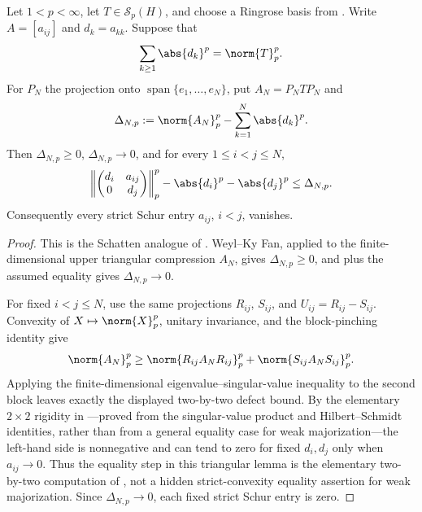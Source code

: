\begin{lemma}
  \label{lem:schatten-triangular-equality-pinching}
  Let \(1<p<\infty\), let \(T\in\mathcal S_p(H)\), and choose a Ringrose
  basis from . Write
  \(A=[a_{ij}]\) and \(d_k=a_{kk}\). Suppose that
  \[
    \sum_{k\ge1}\abs{d_k}^p=\norm{T}_p^p.
  \]
  For \(P_N\) the projection onto
  \(\operatorname{span}\{e_1,\ldots,e_N\}\), put \(A_N=P_NTP_N\) and
  \[
    \Delta_{N,p}:=\norm{A_N}_p^p-\sum_{k=1}^N\abs{d_k}^p.
  \]
  Then \(\Delta_{N,p}\ge0\), \(\Delta_{N,p}\to0\), and for every
  \(1\le i<j\le N\),
  \[
    \left\|
      \begin{pmatrix}d_i&a_{ij}\\0&d_j\end{pmatrix}
    \right\|_p^p-\abs{d_i}^p-\abs{d_j}^p
    \le \Delta_{N,p}.
  \]
  Consequently every strict Schur entry \(a_{ij}\), \(i<j\), vanishes.
\end{lemma}

\begin{proof}
  This is the Schatten analogue of
  . Weyl--Ky Fan, applied to
  the finite-dimensional upper triangular compression \(A_N\), gives
  \(\Delta_{N,p}\ge0\), and
   plus the assumed equality gives
  \(\Delta_{N,p}\to0\).

  For fixed \(i<j\le N\), use the same projections
  \(R_{ij}\), \(S_{ij}\), and \(U_{ij}=R_{ij}-S_{ij}\). Convexity of
  \(X\mapsto\norm{X}_p^p\), unitary invariance, and the block-pinching
  identity give
  \[
    \norm{A_N}_p^p
    \ge \norm{R_{ij}A_NR_{ij}}_p^p+\norm{S_{ij}A_NS_{ij}}_p^p.
  \]
  Applying the finite-dimensional eigenvalue--singular-value inequality
  to the second block leaves exactly the displayed two-by-two defect
  bound. By the elementary \(2\times2\) rigidity in
  ---proved from the singular-value
  product and Hilbert--Schmidt identities, rather than from a general
  equality case for weak majorization---the left-hand side is nonnegative
  and can tend to zero for fixed \(d_i,d_j\) only when \(a_{ij}\to0\).  Thus
  the equality step in this triangular lemma is the elementary two-by-two
  computation of , not a hidden
  strict-convexity equality assertion for weak majorization.
  Since \(\Delta_{N,p}\to0\), each fixed strict Schur entry is zero.
\end{proof}

